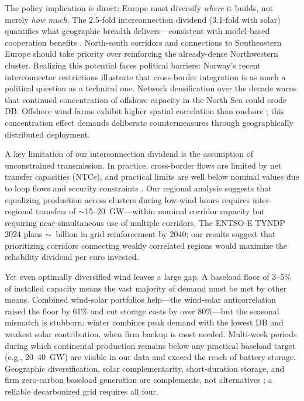 \documentclass[sn-nature]{sn-jnl}%
\begin{document}
The policy implication is direct: Europe must diversify \textit{where} it builds, not merely \textit{how much}. The 2.5-fold interconnection dividend (3.1-fold with solar) quantifies what geographic breadth delivers---consistent with model-based cooperation benefits \cite{schlachtberger2017,rodriguez2014}. North-south corridors and connections to Southeastern Europe should take priority over reinforcing the already-dense Northwestern cluster. Realizing this potential faces political barriers: Norway's recent interconnector restrictions illustrate that cross-border integration is as much a political question as a technical one. Network densification over the decade warns that continued concentration of offshore capacity in the North Sea could erode DB. Offshore wind farms exhibit higher spatial correlation than onshore \cite{kempton2010,potisomporn2022,hjelmeland2023}; this concentration effect demands deliberate countermeasures through geographically distributed deployment.

A key limitation of our interconnection dividend is the assumption of unconstrained transmission. In practice, cross-border flows are limited by net transfer capacities (NTCs), and practical limits are well below nominal values due to loop flows and security constraints \cite{entsoe2024tyndp}. Our regional analysis suggests that equalizing production across clusters during low-wind hours requires inter-regional transfers of $\sim$15--20~GW---within nominal corridor capacity but requiring near-simultaneous use of multiple corridors. The ENTSO-E TYNDP 2024 plans $\sim$~billion in grid reinforcement by 2040; our results suggest that prioritizing corridors connecting weakly correlated regions would maximize the reliability dividend per euro invested.

Yet even optimally diversified wind leaves a large gap. A baseload floor of 3--5\% of installed capacity means the vast majority of demand must be met by other means. Combined wind-solar portfolios help---the wind-solar anticorrelation raised the floor by 61\% and cut storage costs by over 80\%---but the seasonal mismatch is stubborn: winter combines peak demand with the lowest DB and weakest solar contribution, when firm backup is most needed. Multi-week periods during which continental production remains below any practical baseload target (e.g., 20--40~GW) are visible in our data and exceed the reach of battery storage. Geographic diversification, solar complementarity, short-duration storage, and firm zero-carbon baseload generation are complements, not alternatives \cite{brown2018}; a reliable decarbonized grid requires all four.
\end{document}
